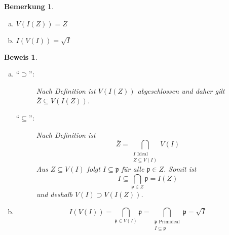 \documentclass[a4paper,oneside]{scrbook}
\theoremstyle{break}
\newtheorem{Bem}[Def]{Bemerkung}
\theoremstyle{nonumberbreak}
\theoremstyle{nonumberplain}
\newtheorem{Bew}{Beweis}
\theoremstyle{break}
\newcommand{\closure}[1]{%
	\ensuremath{\overline{#1}}%
}
\newcommand{\rad}[1]{%
	\ensuremath{\sqrt{#1}}%
}
\begin{document}
\begin{Bem}
	\begin{enumerate}[(a)]
		\item $V\left( I\left(Z\right) \right) = \closure{Z}$
		\item $I\left( V\left(I\right) \right) = \rad{I}$
	\end{enumerate}
\end{Bem}
\begin{Bew}
	\begin{enumerate}[(a)]
		\item 
			\begin{description}
				\item["`$\supset$"':] Nach Definition ist $V\left( I\left(Z\right) \right)$ abgeschlossen und daher gilt $\closure{Z} \subseteq V\left(I\left(Z\right)\right)$.
				\item["`$\subseteq$"':] 
					Nach Definition ist
					\[
					\closure{Z} = \bigcap_{\substack{I \text{ Ideal}\\
						Z \subseteq V\left(I\right)}} V(I)
					\]
					Aus $Z \subseteq V\left(I\right)$ folgt $I \subseteq \mathfrak{p}$ für alle $\mathfrak{p} \in Z$. Somit ist
					\[
					I \subseteq \bigcap_{\mathfrak{p} \in Z} \mathfrak{p} = I\left(Z\right)
					\]
					und deshalb $V\left(I\right) \supset V(I(Z))$.
			\end{description}
		\item
			\[ I\left(V\left(I\right)\right)	= \bigcap_{\mathfrak{p} \in V\left(I\right)} \mathfrak{p} 
						= \bigcap_{ \substack{ \mathfrak{p} \text{ Primideal}\\
							I \subseteq \mathfrak{p}}} \mathfrak{p}
						= \rad{I}
			\]
	\end{enumerate}
\end{Bew}
\end{document}
